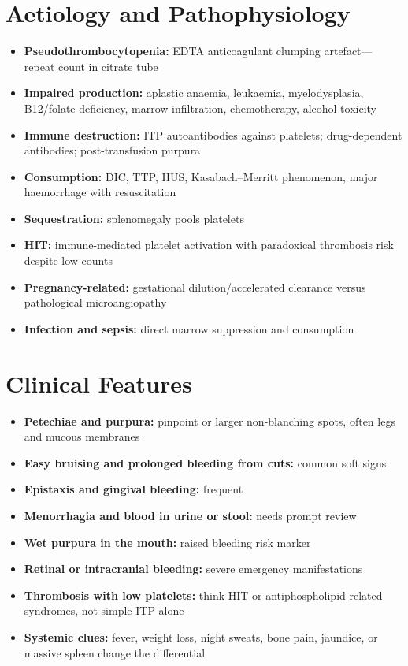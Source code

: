 \section*{Aetiology and Pathophysiology}
\begin{itemize}
    \item \textbf{Pseudothrombocytopenia:} EDTA anticoagulant clumping artefact---repeat count in citrate tube
    \item \textbf{Impaired production:} aplastic anaemia, leukaemia, myelodysplasia, B12/folate deficiency, marrow infiltration, chemotherapy, alcohol toxicity
    \item \textbf{Immune destruction:} ITP autoantibodies against platelets; drug-dependent antibodies; post-transfusion purpura
    \item \textbf{Consumption:} DIC, TTP, HUS, Kasabach--Merritt phenomenon, major haemorrhage with resuscitation
    \item \textbf{Sequestration:} splenomegaly pools platelets
    \item \textbf{HIT:} immune-mediated platelet activation with paradoxical thrombosis risk despite low counts
    \item \textbf{Pregnancy-related:} gestational dilution/accelerated clearance versus pathological microangiopathy
    \item \textbf{Infection and sepsis:} direct marrow suppression and consumption
\end{itemize}

\section*{Clinical Features}
\begin{itemize}
    \item \textbf{Petechiae and purpura:} pinpoint or larger non-blanching spots, often legs and mucous membranes
    \item \textbf{Easy bruising and prolonged bleeding from cuts:} common soft signs
    \item \textbf{Epistaxis and gingival bleeding:} frequent
    \item \textbf{Menorrhagia and blood in urine or stool:} needs prompt review
    \item \textbf{Wet purpura in the mouth:} raised bleeding risk marker
    \item \textbf{Retinal or intracranial bleeding:} severe emergency manifestations
    \item \textbf{Thrombosis with low platelets:} think HIT or antiphospholipid-related syndromes, not simple ITP alone
    \item \textbf{Systemic clues:} fever, weight loss, night sweats, bone pain, jaundice, or massive spleen change the differential
\end{itemize}

